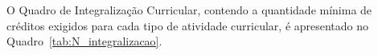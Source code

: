 

O Quadro de Integralização Curricular, contendo a quantidade mínima de créditos exigidos para cada tipo de atividade curricular, é apresentado no Quadro~\ref{tab:N_integralizacao}.

